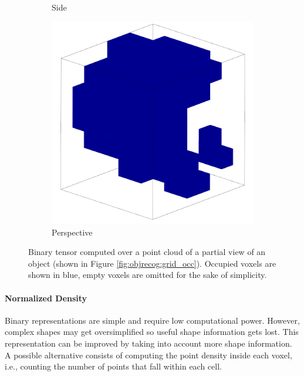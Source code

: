 \begin{figure}[!hb]
\begin{subfigure}{0.325\textwidth}
		\caption{Side}
		\label{subfig:objrecog:binary_occ:side}
	\end{subfigure}
	\hfill
	\begin{subfigure}{0.325\textwidth}
		\centering
		\includegraphics[width=\linewidth]{Figures/ObjRecog/binary_persp}
		\caption{Perspective}
		\label{subfig:objrecog:binary_occ:persp}
	\end{subfigure}
	\hfill
	\caption{Binary tensor computed over a point cloud of a partial view of an object (shown in Figure \ref{fig:objrecog:grid_occ}). Occupied voxels are shown in blue, empty voxels are omitted for the sake of simplicity.}
	\label{fig:objrecog:binary_occ}
\end{figure}

\paragraph{Normalized Density}

Binary representations are simple and require low computational power. However, complex shapes may get oversimplified so useful shape information gets lost. This representation can be improved by taking into account more shape information. A possible alternative consists of computing the point density inside each voxel, i.e., counting the number of points that fall within each cell.

